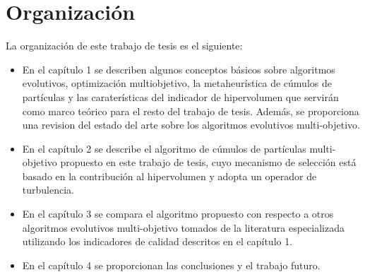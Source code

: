 \section*{Organizaci\'on}

La organizaci\'on de este trabajo de tesis es el siguiente:

\begin{itemize}
 \item  En el cap\'itulo 1 se describen algunos conceptos b\'asicos sobre algoritmos evolutivos, optimizaci\'on multiobjetivo, 
 la metaheur\'istica de c\'umulos de part\'iculas y las carater\'isticas del indicador de hipervolumen que servir\'an como 
 marco te\'orico  para el resto del trabajo de tesis. Adem\'as, se proporciona una revision del estado del arte sobre los 
 algoritmos evolutivos multi-objetivo.
 \item En el cap\'itulo 2 se describe el algoritmo de c\'umulos de part\'iculas multi-objetivo propuesto en este trabajo de 
 tesis, cuyo mecanismo de selecci\'on est\'a basado en la contribuci\'on al hipervolumen y adopta un operador de turbulencia.
 \item En el cap\'itulo 3 se compara el algoritmo propuesto con respecto a otros algoritmos evolutivos multi-objetivo tomados
 de la literatura especializada  utilizando los indicadores de calidad descritos en el cap\'itulo 1.
 \item En el cap\'itulo 4 se proporcionan las conclusiones y el trabajo futuro.
\end{itemize}
